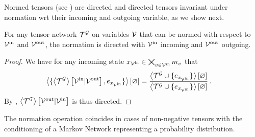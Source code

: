 
Normed tensors (see ) are directed and directed tensors invariant under normation wrt their incoming and outgoing variable, as we show next.

\begin{theorem}
    \label{the:normationDirected}
    For any tensor network $\mathcal{T}^{\mathcal{G}}$ on variables $\mathcal{V}$ that can be normed with respect to $\mathcal{V}^{\mathrm{in}}$ and $\mathcal{V}^{\mathrm{out}}$, the normation is directed with $\mathcal{V}^{\mathrm{in}}$ incoming and $\mathcal{V}^{\mathrm{out}}$ outgoing.
\end{theorem}
\begin{proof}
    We have for any incoming state ${x_{\mathcal{V}^{\mathrm{in}}}\in\bigtimes_{v\in\mathcal{V}^{\mathrm{in}}}m_{v}}$ that
    \begin{align*}
        \left\langle \{\left\langle \mathcal{T}^{\mathcal{G}}\right\rangle \left[ \mathcal{V}^{\mathrm{in}} | \mathcal{V}^{\mathrm{out}} \right], e_{x_{\mathcal{V}^{\mathrm{in}}}} \}\right\rangle \left[ \varnothing \right]
        & =  \frac{
            \left\langle \mathcal{T}^{\mathcal{G}}\cup\{e_{x_{\mathcal{V}^{\mathrm{in}}}}\}\right\rangle \left[ \varnothing \right]
        }{
            \left\langle \mathcal{T}^{\mathcal{G}}\cup\{e_{x_{\mathcal{V}^{\mathrm{in}}}}\}\right\rangle \left[ \varnothing \right]
        } \, .
    \end{align*}
    By , $\left\langle \mathcal{T}^{\mathcal{G}}\right\rangle \left[ \mathcal{V}^{\mathrm{out}} | \mathcal{V}^{\mathrm{in}} \right]$ is thus directed.
\end{proof}

The normation operation coincides in cases of non-negative tensors with the conditioning of a Markov Network representing a probability distribution.




